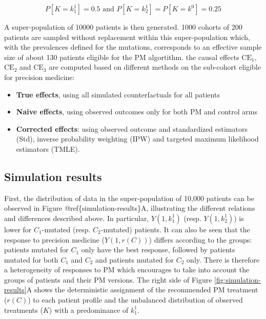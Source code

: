 \documentclass[a4paper,12pt,twoside,onecolumn,openright,final,oldfontcommands]{memoir}
\providecommand{\tightlist}{%
  \setlength{\itemsep}{0pt}\setlength{\parskip}{0pt}}
\begin{document}
\[P[K=k^1_1]=0.5 \text{ and } P[K=k^1_2]=P[K=k^0]=0.25\]

A super-population of 10000 patients is then generated. 1000 cohorts of
200 patients are sampled without replacement within this
super-population which, with the prevalences defined for the mutations,
corresponds to an effective sample size of about 130 patients eligible
for the PM algortithm. the causal effects \(\text{CE}_1\),
\(\text{CE}_2\) and \(\text{CE}_3\) are computed based on different
methods on the sub-cohort eligible for precision medicine:

\begin{itemize}
\tightlist
\item
  \textbf{True effects}, using all simulated counterfactuals for all
  patients
\item
  \textbf{Naive effects}, using observed outcomes only for both PM and
  control arms
\item
  \textbf{Corrected effects}: using observed outcome and standardized
  estimators (Std), inverse probability weighting (IPW) and targeted
  maximum likelihood estimators (TMLE).
\end{itemize}

\subsection{Simulation results}\label{simulation-results}

First, the distribution of data in the super-population of 10,000
patients can be observed in Figure @ref\{simulation-results\}A,
illustrating the different relations and differences described above. In
particular, \(Y(1, k^1_1)\) (resp. \(Y(1, k^1_2)\)) is lower for
\(C_1\)-mutated (resp. \(C_2\)-mutated) patients. It can also be seen
that the response to precision medicine (\(Y(1, r(C))\)) differs
according to the groups: patients mutated for \(C_1\) only have the best
response, followed by patients mutated for both \(C_1\) and \(C_2\) and
patients mutated for \(C_2\) only. There is therefore a heterogeneity of
responses to PM which encourages to take into account the groups of
patients and their PM versions. The right side of Figure
\ref{fig:simulation-results}A shows the deterministic assignment of the
recommended PM treatment (\(r(C)\)) to each patient profile and the
unbalanced distribution of observed treatments (\(K\)) with a
predominance of \(k^1_1\).
\end{document}
